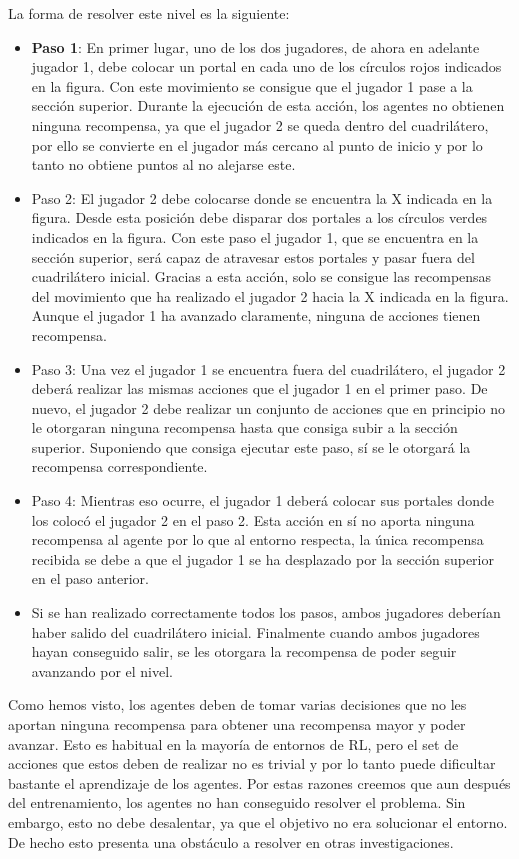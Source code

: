 La forma de resolver este nivel es la siguiente:
\begin{itemize}
    \item \textbf{Paso 1}: En primer lugar, uno de los dos jugadores, de ahora en adelante jugador 1, debe colocar un portal en cada uno de los círculos rojos indicados en la figura. Con este movimiento se consigue que el jugador 1 pase a la sección superior. Durante la ejecución de esta acción, los agentes no obtienen ninguna recompensa, ya que el jugador 2 se queda dentro del cuadrilátero, por ello se convierte en el jugador más cercano al punto de inicio y por lo tanto no obtiene puntos al no alejarse este.
    \item Paso 2: El jugador 2 debe colocarse donde se encuentra la X indicada en la figura. Desde esta posición debe disparar dos portales a los círculos verdes indicados en la figura. Con este paso el jugador 1, que se encuentra en la sección superior, será capaz de atravesar estos portales y pasar fuera del cuadrilátero inicial. Gracias a esta acción, solo se consigue las recompensas del movimiento que ha realizado el jugador 2 hacia la X indicada en la figura. Aunque el jugador 1 ha avanzado claramente, ninguna de acciones tienen recompensa.
    \item Paso 3: Una vez el jugador 1 se encuentra fuera del cuadrilátero, el jugador 2 deberá realizar las mismas acciones que el jugador 1 en el primer paso. De nuevo, el jugador 2 debe realizar un conjunto de acciones que en principio no le otorgaran ninguna recompensa hasta que consiga subir a la sección superior. Suponiendo que consiga ejecutar este paso, sí se le otorgará la recompensa correspondiente.
    \item Paso 4: Mientras eso ocurre, el jugador 1 deberá colocar sus portales donde los colocó el jugador 2 en el paso 2. Esta acción en sí no aporta ninguna recompensa al agente por lo que al entorno respecta, la única recompensa recibida se debe a que el jugador 1 se ha desplazado por la sección superior en el paso anterior.
    \item Si se han realizado correctamente todos los pasos, ambos jugadores deberían haber salido del cuadrilátero inicial. Finalmente cuando ambos jugadores hayan conseguido salir, se les otorgara la recompensa de poder seguir avanzando por el nivel.
\end{itemize}

Como hemos visto, los agentes deben de tomar varias decisiones que no les aportan ninguna recompensa para obtener una recompensa mayor y poder avanzar. Esto es habitual en la mayoría de entornos de RL, pero el set de acciones que estos deben de realizar no es trivial y por lo tanto puede dificultar bastante el aprendizaje de los agentes. Por estas razones creemos que aun después del entrenamiento, los agentes no han conseguido resolver el problema. Sin embargo, esto no debe desalentar, ya que el objetivo no era solucionar el entorno. De hecho esto presenta una obstáculo a resolver en otras investigaciones.